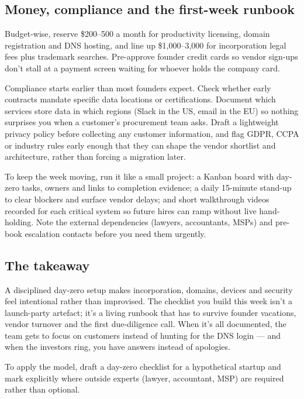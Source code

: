 \subsection{Money, compliance and the first-week runbook}


Budget-wise, reserve \$200–500 a month for productivity licensing, domain registration and DNS hosting, and line up \$1,000–3,000 for incorporation legal fees plus trademark searches. Pre-approve founder credit cards so vendor sign-ups don't stall at a payment screen waiting for whoever holds the company card.


Compliance starts earlier than most founders expect. Check whether early contracts mandate specific data locations or certifications. Document which services store data in which regions (Slack in the US, email in the EU) so nothing surprises you when a customer's procurement team asks. Draft a lightweight privacy policy before collecting any customer information, and flag GDPR, CCPA or industry rules early enough that they can shape the vendor shortlist and architecture, rather than forcing a migration later.


To keep the week moving, run it like a small project: a Kanban board with day-zero tasks, owners and links to completion evidence; a daily 15-minute stand-up to clear blockers and surface vendor delays; and short walkthrough videos recorded for each critical system so future hires can ramp without live hand-holding. Note the external dependencies (lawyers, accountants, MSPs) and pre-book escalation contacts before you need them urgently.



\subsection{The takeaway}


A disciplined day-zero setup makes incorporation, domains, devices and security feel intentional rather than improvised. The checklist you build this week isn't a launch-party artefact; it's a living runbook that has to survive founder vacations, vendor turnover and the first due-diligence call. When it's all documented, the team gets to focus on customers instead of hunting for the DNS login — and when the investors ring, you have answers instead of apologies.


To apply the model, draft a day-zero checklist for a hypothetical startup and mark explicitly where outside experts (lawyer, accountant, MSP) are required rather than optional.

